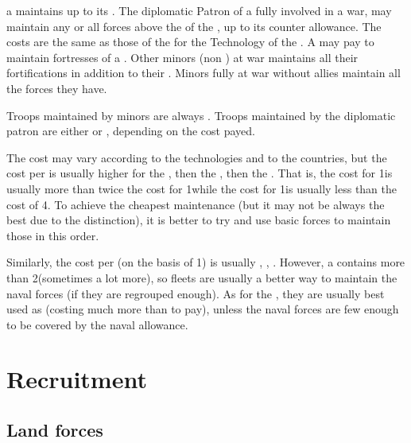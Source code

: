 \aparag[At war] a \MIN maintains up to its .
\bparag The diplomatic Patron of a \MIN fully involved in a war, may maintain
any or all forces above the  of the \MIN, up to its
counter allowance.
\bparag The costs are the same as those of the \MAJ for the Technology of the
\MIN.
\bparag A \MAJ may pay to maintain fortresses of a \VASSAL.
\bparag Other minors (non \VASSAL) at war maintains all their fortifications
in addition to their .
\bparag Minors fully at war without \MAJ allies maintain all the forces they
have.

\aparag[Moral] Troops maintained by minors are always .
\bparag Troops maintained by the diplomatic patron are either 
or , depending on the cost payed.

\begin{designnote} The cost may vary according to the
  technologies and to the countries, but the cost per \LD is usually higher
  for the \ARMY\facemoins, then the \LD, then the \ARMY\faceplus. That is, the
  cost for 1\ARMY\Facemoins is usually more than twice the cost for 1\LD while
  the cost for 1\ARMY\Faceplus is usually less than the cost of 4\LD. To
  achieve the cheapest maintenance (but it may not be always the best due to
  the  distinction), it is better to try and use basic forces
  to maintain those in this order.

  Similarly, the cost per \ND (on the basis of 1\FLEET{}\ND) is
  usually \FLEET\facemoins, \ND, \FLEET\faceplus. However, a \FLEET\facemoins
  contains more than 2\ND (sometimes a lot more), so fleets are usually a
  better way to maintain the naval forces (if they are regrouped enough). As
  for the \GD, they are usually best used as \ND (costing much more than \LD
  to pay), unless the naval forces are few enough to be covered by the naval
  allowance.
\end{designnote}





\section{Recruitment}



\subsection{Land forces}


